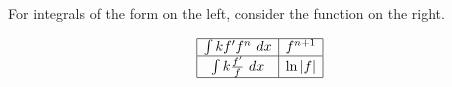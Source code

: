 \documentclass[../main.tex]{subfile}
\begin{document}

\begin{center}
For integrals of the form on the left, consider the function on the right.
\end{center}
\vspace{-1em}

{\large\renewcommand{\arraystretch}{1.8}
$$\begin{array}{|c|c|}
	\hline
	\int k f' f^n \ d x & f^{n + 1} \\
	\hline
	\int k \frac{f'}{f} \ d x & \ln|f| \\
	\hline
\end{array}$$}
\end{document}
